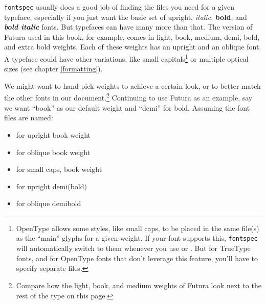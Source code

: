\texttt{fontspec} usually does a good job of finding
the files you need for a given typeface,
especially if you just want the basic set of
upright,
\textit{italic},
\textbf{bold}, and
\textit{\textbf{bold italic}} fonts.
But typefaces can have many more than that.
The version of Futura used in this book, for example, comes in
{light},
{book},
{medium},
{demi},
{bold}, and
{extra bold} weights.
Each of these weights has an upright and an oblique font.
A typeface could have other variations,
like {small capitals}\footnote{%
OpenType allows some styles, like small caps, to be placed in the same file(s)
as the ``main'' glyphs for a given weight.
If your font supports this, \texttt{fontspec}
will automatically switch to them whenever you use
 or .
But for TrueType fonts,
and for OpenType fonts that don't leverage this feature,
you'll have to specify separate files.}
or multiple optical sizes (see chapter \ref{formatting}).

We might want to hand-pick weights to achieve a certain look,
or to better match the
other fonts in our document.\punckern\footnote{Compare how
{the light,}
{book,}
{and medium weights}
of Futura look next to the rest of the type on this page.}
Continuing to use Futura as an example,
say we want ``book'' as our default weight
and ``demi'' for bold.
Assuming the font files are named:
\begin{itemize}
\item {} for
    {upright book weight}
\item {} for
    {oblique book weight}
\item {} for
    {small caps, book weight}
\item {} for
    {upright demi(bold)}
\item {} for
    {oblique demibold}
\end{itemize}

